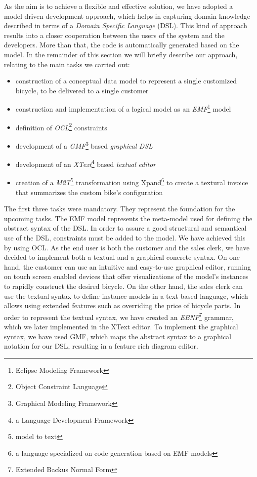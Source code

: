 \noindent As the aim is to achieve a flexible and effective solution, we have
adopted a model driven development approach, which helps in capturing domain
knowledge described in terms of a \emph{Domain Specific Language} (DSL). This
kind of approach results into a closer cooperation between the users of the
system and the developers. More than that, the code is automatically generated
based on the model. In the remainder of this section we will briefly describe
our approach, relating to the main tasks we carried out:
\begin{itemize}
  \item construction of a conceptual data model to represent a single customized
  bicycle, to be delivered to a single customer
  \item construction and implementation of a logical model as an
  \emph{EMF}\footnote{Eclipse Modeling Framework} model
  \item definition of \emph{OCL}\footnote{Object Constraint Language}
  constraints
  \item development of a \emph{GMF}\footnote{Graphical Modeling Framework} based
  \emph{graphical DSL}
  \item development of an \emph{XText}\footnote{a Language Development
  Framework} based \emph{textual editor}
  \item creation of a \emph{M2T}\footnote{model to text} transformation using
  Xpand\footnote{a language specialized on code generation based on EMF models}
  to create a textural invoice that summarizes the custom bike's configuration
\end{itemize} 

\noindent The first three tasks were mandatory. They represent the foundation
for the upcoming tasks. The EMF model represents the meta-model used for
defining the abstract syntax of the DSL. In order to assure a good structural
and semantical use of the DSL, constraints must be added to the model. We have
achieved this by using OCL. As the end user is both the customer and the sales
clerk, we have decided to implement both a textual and a graphical concrete syntax. On
one hand, the customer can use an intuitive and easy-to-use graphical
editor, running on touch screen enabled devices that offer visualizations
of the model's instances to rapidly construct the desired bicycle. On the other
hand, the sales clerk can use the textual syntax to define instance models in a
text-based language, which allows using extended features such as overriding
the price of bicycle parts. In order to represent the textual syntax, we have
created an \emph{EBNF}\footnote{Extended Backus Normal Form} grammar, which we later 
implemented in the XText editor. To implement the graphical syntax, we have used GMF, 
which maps the abstract syntax to a graphical notation for our DSL, resulting in
a feature rich diagram editor.\\

